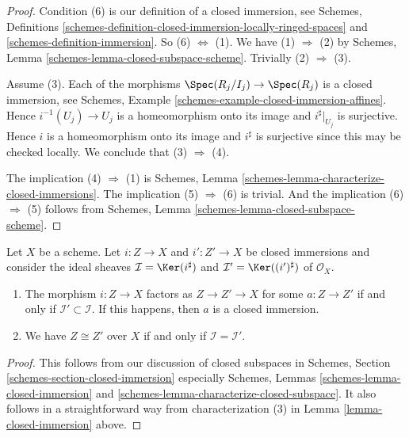 \begin{proof}
Condition (6) is our definition of a closed immersion, see Schemes,
Definitions \ref{schemes-definition-closed-immersion-locally-ringed-spaces}
and \ref{schemes-definition-immersion}.
So (6) $\Leftrightarrow$ (1). We have (1) $\Rightarrow$ (2) by
Schemes, Lemma \ref{schemes-lemma-closed-subspace-scheme}.
Trivially (2) $\Rightarrow$ (3).

\medskip\noindent
Assume (3). Each of the morphisms
$\Spec(R_j/I_j) \to \Spec(R_j)$ is
a closed immersion, see
Schemes, Example \ref{schemes-example-closed-immersion-affines}.
Hence $i^{-1}(U_j) \to U_j$ is a homeomorphism onto its image
and $i^\sharp|_{U_j}$ is surjective. Hence $i$ is a homeomorphism
onto its image and $i^\sharp$ is surjective since this may be
checked locally. We conclude that (3) $\Rightarrow$ (4).

\medskip\noindent
The implication (4) $\Rightarrow$ (1) is
Schemes, Lemma \ref{schemes-lemma-characterize-closed-immersions}.
The implication (5) $\Rightarrow$ (6) is trivial.
And the implication (6) $\Rightarrow$ (5) follows
from Schemes, Lemma \ref{schemes-lemma-closed-subspace-scheme}.
\end{proof}

\begin{lemma}
\label{lemma-closed-immersion-ideals}
Let $X$ be a scheme. Let $i : Z \to X$ and $i' : Z' \to X$
be closed immersions and consider the ideal sheaves
$\mathcal{I} = \Ker(i^\sharp)$ and $\mathcal{I}' = \Ker((i')^\sharp)$
of $\mathcal{O}_X$.
\begin{enumerate}
\item The morphism $i : Z \to X$ factors as $Z \to Z' \to X$
for some $a : Z \to Z'$ if and only if $\mathcal{I}' \subset \mathcal{I}$.
If this happens, then $a$ is a closed immersion.
\item We have $Z \cong Z'$ over $X$ if and only if
$\mathcal{I} = \mathcal{I}'$.
\end{enumerate}
\end{lemma}

\begin{proof}
This follows from our discussion of closed subspaces in
Schemes, Section \ref{schemes-section-closed-immersion} especially
Schemes, Lemmas
\ref{schemes-lemma-closed-immersion} and
\ref{schemes-lemma-characterize-closed-subspace}.
It also follows in a straightforward way from characterization
(3) in Lemma \ref{lemma-closed-immersion} above.
\end{proof}

